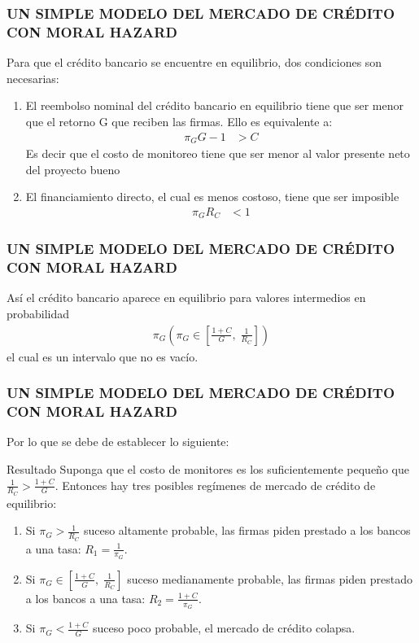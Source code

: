 \begin{frame}
\frametitle{{\normalsize UN SIMPLE MODELO DEL MERCADO DE CRÉDITO CON MORAL HAZARD} {}}
   
Para que el crédito bancario se encuentre en equilibrio, dos condiciones son necesarias:
\begin{enumerate}
	\item El reembolso nominal del crédito bancario en equilibrio tiene que ser menor que el retorno G que reciben las firmas. Ello es equivalente a:
	\begin{align}
	\pi_{G}G-1&>C
	\end{align} 
	Es decir que el costo de monitoreo tiene que ser menor al valor presente neto del proyecto bueno 
	\item El financiamiento directo, el cual es menos costoso, tiene que ser imposible
	\begin{align}
	\pi_{G}R_{C}&<1
	\end{align} 
\end{enumerate}

\end{frame}


\begin{frame}
    \frametitle{{\normalsize UN SIMPLE MODELO DEL MERCADO DE CRÉDITO CON MORAL HAZARD} {}}
   Así el crédito bancario aparece en equilibrio para valores intermedios en probabilidad
    \begin{align}
    \pi_{G}(\pi_{G} \in \left[\frac{1+C}{G},\; \frac{1}{R_{C}}\right] )\nonumber
    \end{align} 
    el cual es un intervalo que no es vacío.
    
\end{frame}

\begin{frame}
\frametitle{{\normalsize UN SIMPLE MODELO DEL MERCADO DE CRÉDITO CON MORAL HAZARD} {}}
Por lo que se debe de establecer lo siguiente:
\begin{block} {Resultado} 
	Suponga que el costo de monitores es los suficientemente pequeño que $\frac{1}{R_{C}}>\frac{1+C}{G} $. Entonces hay tres posibles regímenes de mercado de crédito de equilibrio:
	\begin{enumerate}
		\item Si $\pi_{G}>\frac{1}{R_{C}}$ suceso altamente probable, las firmas piden prestado a los bancos a una tasa: $R_{1}=\frac{1}{\pi_{G}}$.
		\item  Si $\pi_{G}\in \left[\frac{1+C}{G},\; \frac{1}{R_{C}}\right] $ suceso medianamente probable, las firmas piden prestado a los bancos a una tasa: $R_{2}=\frac{1+C}{\pi_{G}}$. 
		\item  Si $\pi_{G} < \frac{1+C}{G} $ suceso poco probable, el mercado de crédito colapsa.
	\end{enumerate}    
\end{block}    

\end{frame}

